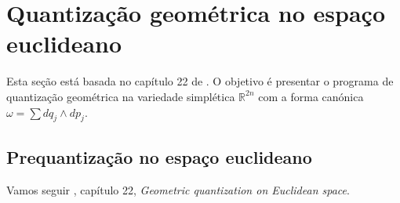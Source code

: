 \section{Quantização geométrica no espaço euclideano}

Esta seção está basada no capítulo 22 de \cite{hallq}. O objetivo é presentar o programa de quantização geométrica na variedade simplética $\mathbb{R}^{2n}$ com a forma canónica $\omega=\sum dq_j\wedge dp_j$.

\subsection{Prequantização no espaço euclideano}

Vamos seguir \cite{hallq}, capítulo 22, \textit{Geometric quantization on Euclidean space}.

